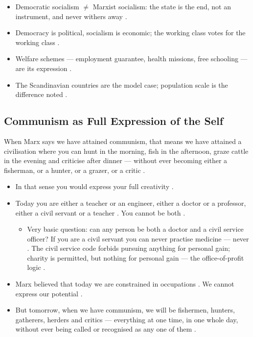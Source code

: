 \begin{QuickRevision}
\begin{itemize}
    \item Democratic socialism $\neq$ Marxist socialism: the state is the end, not an instrument, and never withers away .
    \item Democracy is political, socialism is economic; the working class votes for the working class .
    \item Welfare schemes --- employment guarantee, health missions, free schooling --- are its expression .
    \item The Scandinavian countries are the model case; population scale is the difference noted .
\end{itemize}
\end{QuickRevision}

\subsection{Communism as Full Expression of the Self}
\begin{KeyConcept}
When Marx says we have attained communism, that means we have attained a civilisation where you can hunt in the morning, fish in the afternoon, graze cattle in the evening and criticise after dinner --- without ever becoming either a fisherman, or a hunter, or a grazer, or a critic .
\end{KeyConcept}

\begin{itemize}
    \item In that sense you would express your full creativity .
    \item Today you are either a teacher or an engineer, either a doctor or a professor, either a civil servant or a teacher . You cannot be both .
    \begin{itemize}
        \item Very basic question: can any person be both a doctor and a civil service officer? If you are a civil servant you can never practise medicine --- never . The civil service code forbids pursuing anything for personal gain; charity is permitted, but nothing for personal gain --- the office-of-profit logic .
    \end{itemize}
    \item Marx believed that today we are constrained in occupations . We cannot express our potential .
    \item But tomorrow, when we have communism, we will be fishermen, hunters, gatherers, herders and critics --- everything at one time, in one whole day, without ever being called or recognised as any one of them .
\end{itemize}

